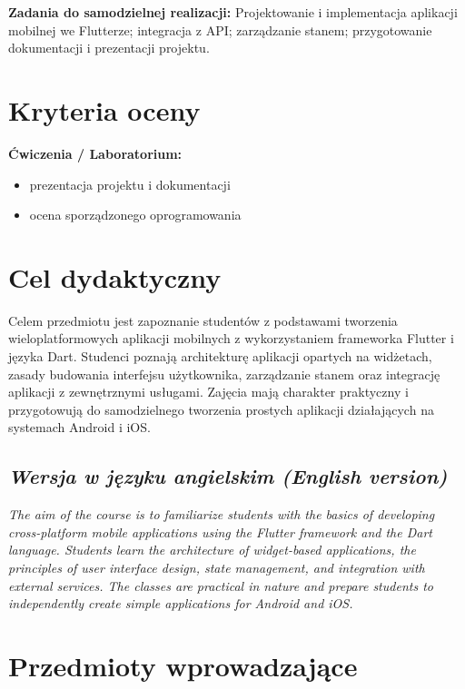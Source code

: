 \documentclass[12pt, a4paper]{article}
\begin{document}
\vspace{4pt}
\noindent\textbf{Zadania do samodzielnej realizacji:} Projektowanie i implementacja aplikacji mobilnej we Flutterze; integracja z API; zarządzanie stanem; przygotowanie dokumentacji i prezentacji projektu.

\section{Kryteria oceny}

\textbf{Ćwiczenia / Laboratorium:}
\begin{itemize}
  \item prezentacja projektu i dokumentacji
  \item ocena sporządzonego oprogramowania
\end{itemize}


\section{Cel dydaktyczny}

Celem przedmiotu jest zapoznanie studentów z podstawami tworzenia wieloplatformowych aplikacji mobilnych z wykorzystaniem frameworka Flutter i języka Dart. Studenci poznają architekturę aplikacji opartych na widżetach, zasady budowania interfejsu użytkownika, zarządzanie stanem oraz integrację aplikacji z zewnętrznymi usługami. Zajęcia mają charakter praktyczny i przygotowują do samodzielnego tworzenia prostych aplikacji działających na systemach Android i iOS.

\subsection*{\textit{Wersja w języku angielskim (English version)}}

\textit{The aim of the course is to familiarize students with the basics of developing cross-platform mobile applications using the Flutter framework and the Dart language. Students learn the architecture of widget-based applications, the principles of user interface design, state management, and integration with external services. The classes are practical in nature and prepare students to independently create simple applications for Android and iOS.}


\section{Przedmioty wprowadzające}
\end{document}
